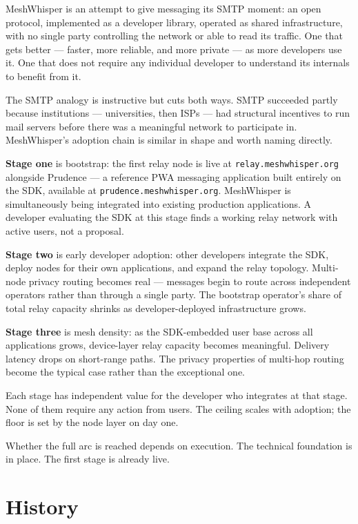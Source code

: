 \documentclass[11pt, a4paper]{article}
\begin{document}
MeshWhisper is an attempt to give messaging its SMTP moment: an open protocol, implemented as a developer library, operated as shared infrastructure, with no single party controlling the network or able to read its traffic. One that gets better — faster, more reliable, and more private — as more developers use it. One that does not require any individual developer to understand its internals to benefit from it.

The SMTP analogy is instructive but cuts both ways. SMTP succeeded partly because institutions — universities, then ISPs — had structural incentives to run mail servers before there was a meaningful network to participate in. MeshWhisper's adoption chain is similar in shape and worth naming directly.

\textbf{Stage one} is bootstrap: the first relay node is live at \texttt{relay.meshwhisper.org} alongside Prudence --- a reference PWA messaging application built entirely on the SDK, available at \texttt{prudence.meshwhisper.org}. MeshWhisper is simultaneously being integrated into existing production applications. A developer evaluating the SDK at this stage finds a working relay network with active users, not a proposal.

\textbf{Stage two} is early developer adoption: other developers integrate the SDK, deploy nodes for their own applications, and expand the relay topology. Multi-node privacy routing becomes real — messages begin to route across independent operators rather than through a single party. The bootstrap operator's share of total relay capacity shrinks as developer-deployed infrastructure grows.

\textbf{Stage three} is mesh density: as the SDK-embedded user base across all applications grows, device-layer relay capacity becomes meaningful. Delivery latency drops on short-range paths. The privacy properties of multi-hop routing become the typical case rather than the exceptional one.

Each stage has independent value for the developer who integrates at that stage. None of them require any action from users. The ceiling scales with adoption; the floor is set by the node layer on day one.

Whether the full arc is reached depends on execution. The technical foundation is in place. The first stage is already live.

\section{History}
\end{document}
